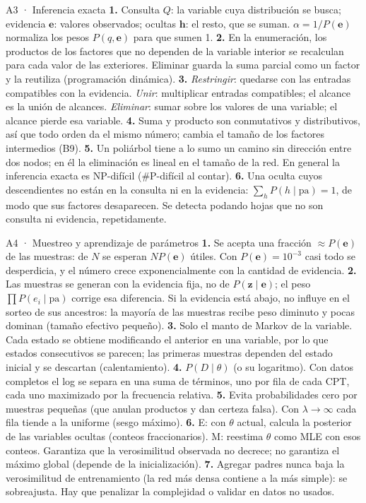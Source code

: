 \begin{solucion}{A3 · Inferencia exacta}
\textbf{1.} Consulta $Q$: la variable cuya distribución se busca; evidencia $\mathbf e$: valores observados; ocultas $\mathbf h$: el
resto, que se suman. $\alpha=1/P(\mathbf e)$ normaliza los pesos $P(q,\mathbf e)$ para que sumen 1.
\textbf{2.} En la enumeración, los productos de los factores que no dependen de la variable interior se recalculan para cada
valor de las exteriores. Eliminar guarda la suma parcial como un factor y la reutiliza (programación dinámica).
\textbf{3.} \emph{Restringir}: quedarse con las entradas compatibles con la evidencia. \emph{Unir}: multiplicar entradas
compatibles; el alcance es la unión de alcances. \emph{Eliminar}: sumar sobre los valores de una variable; el alcance pierde esa variable.
\textbf{4.} Suma y producto son conmutativos y distributivos, así que todo orden da el mismo número; cambia el tamaño de los
factores intermedios (B9).
\textbf{5.} Un poliárbol tiene a lo sumo un camino sin dirección entre dos nodos; en él la eliminación es lineal en el tamaño de
la red. En general la inferencia exacta es NP-difícil (\#P-difícil al contar).
\textbf{6.} Una oculta cuyos descendientes no están en la consulta ni en la evidencia: $\sum_hP(h\mid\mathrm{pa})=1$, de modo que
sus factores desaparecen. Se detecta podando hojas que no son consulta ni evidencia, repetidamente.
\end{solucion}

\begin{solucion}{A4 · Muestreo y aprendizaje de parámetros}
\textbf{1.} Se acepta una fracción $\approx P(\mathbf e)$ de las muestras: de $N$ se esperan $NP(\mathbf e)$ útiles. Con $P(\mathbf e)=10^{-3}$
casi todo se desperdicia, y el número crece exponencialmente con la cantidad de evidencia.
\textbf{2.} Las muestras se generan con la evidencia fija, no de $P(\mathbf z\mid\mathbf e)$; el peso $\prod P(e_i\mid\mathrm{pa})$ corrige esa
diferencia. Si la evidencia está abajo, no influye en el sorteo de sus ancestros: la mayoría de las muestras recibe peso diminuto
y pocas dominan (tamaño efectivo pequeño).
\textbf{3.} Solo el manto de Markov de la variable. Cada estado se obtiene modificando el anterior en una variable, por lo
que estados consecutivos se parecen; las primeras muestras dependen del estado inicial y se descartan (calentamiento).
\textbf{4.} $P(D\mid\theta)$ (o su logaritmo). Con datos completos el log se separa en una suma de términos, uno por fila de cada CPT,
cada uno maximizado por la frecuencia relativa.
\textbf{5.} Evita probabilidades cero por muestras pequeñas (que anulan productos y dan certeza falsa). Con $\lambda\to\infty$ cada fila
tiende a la uniforme (sesgo máximo).
\textbf{6.} E: con $\theta$ actual, calcula la posterior de las variables ocultas (conteos fraccionarios). M: reestima $\theta$ como MLE con esos
conteos. Garantiza que la verosimilitud observada no decrece; no garantiza el máximo global (depende de la inicialización).
\textbf{7.} Agregar padres nunca baja la verosimilitud de entrenamiento (la red más densa contiene a la más simple): se sobreajusta.
Hay que penalizar la complejidad o validar en datos no usados.
\end{solucion}

